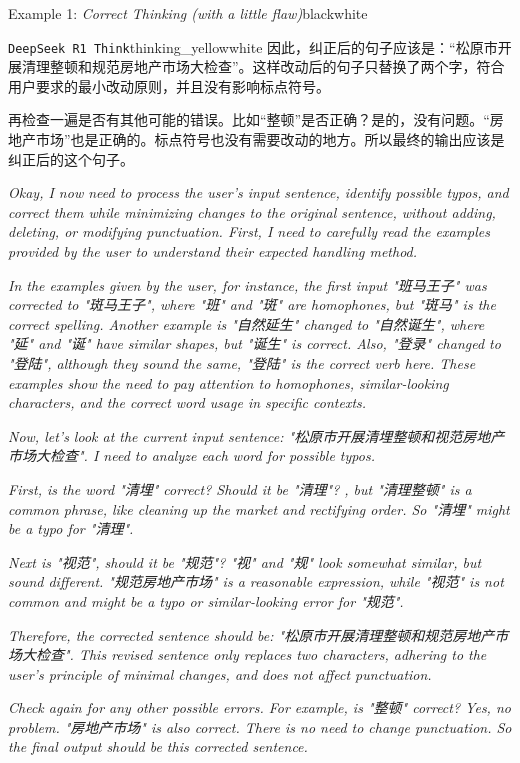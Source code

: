 \begin{figure*}[ph!]
\begin{scopebox}{Example 1: \textit{Correct Thinking (with a little flaw)}}{black}{white}
\begin{scopebox}{\texttt{DeepSeek\,R1 Think}}{thinking_yellow}{white}
            \qquad{}因此，纠正后的句子应该是：“松原市开展清理整顿和规范房地产市场大检查”。这样改动后的句子只替换了两个字，符合用户要求的最小改动原则，并且没有影响标点符号。\return

            \qquad{}再检查一遍是否有其他可能的错误。比如“整顿”是否正确？是的，没有问题。“房地产市场”也是正确的。标点符号也没有需要改动的地方。所以最终的输出应该是纠正后的这个句子。\return

            \tcblower
            \qquad{}\textit{Okay, I now need to process the user's input sentence, identify possible typos, and correct them while minimizing changes to the original sentence, without adding, deleting, or modifying punctuation. First, I need to carefully read the examples provided by the user to understand their expected handling method.}\return

            \qquad{}\textit{In the examples given by the user, for instance, the first input "班马王子" was corrected to "斑马王子", where "班" and "斑" are homophones, but "斑马" is the correct spelling. Another example is "自然延生" changed to "自然诞生", where "延" and "诞" have similar shapes, but "诞生" is correct. Also, "登录" changed to "登陆", although they sound the same, "登陆" is the correct verb here. These examples show the need to pay attention to homophones, similar-looking characters, and the correct word usage in specific contexts.}\return

            \qquad{}\textit{Now, let's look at the current input sentence: "松原市开展清埋整顿和视范房地产市场大检查". I need to analyze each word for possible typos.}\return

            \qquad{}\textit{First, is the word "清埋" correct? Should it be "清理"? , but "清理整顿" is a common phrase, like cleaning up the market and rectifying order. So "清埋" might be a typo for "清理".}\return

            \qquad{}\textit{Next is "视范", should it be "规范"? "视" and "规" look somewhat similar, but sound different. "规范房地产市场" is a reasonable expression, while "视范" is not common and might be a typo or similar-looking error for "规范".}\return

            \qquad{}\textit{Therefore, the corrected sentence should be: "松原市开展清理整顿和规范房地产市场大检查". This revised sentence only replaces two characters, adhering to the user's principle of minimal changes, and does not affect punctuation.}\return

            \qquad{}\textit{Check again for any other possible errors. For example, is "整顿" correct? Yes, no problem. "房地产市场" is also correct. There is no need to change punctuation. So the final output should be this corrected sentence.}\return


\end{scopebox}
\end{scopebox}
\end{figure*}
